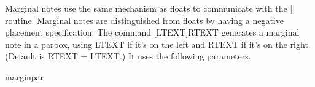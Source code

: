    Marginal notes use the same mechanism as floats to communicate
   with the |\output|  routine.  Marginal notes are distinguished from
   floats by having a negative placement specification.  The command
  \CMDI{\marginpar}[LTEXT]{RTEXT} generates a marginal note in a parbox,
    using LTEXT if it's on the left and RTEXT if it's on the right.
   (Default is RTEXT = LTEXT.)  It uses the following parameters.
%
%
%
%
%
%
%
%
%
 \begin{docCommand}{marginpar} {}
    \begin{teX}
\def\marginpar{%
  \ifhmode
    \@bsphack
    \@floatpenalty -\@Mii
  \else
    \@floatpenalty-\@Miii
  \fi
  \ifinner
    \@parmoderr
    \@floatpenalty\z@
  \else
    \@next\@currbox\@freelist{}{}%
    \@next\@marbox\@freelist{\global\count\@marbox\m@ne}%
       {\@floatpenalty\z@
        \@fltovf\def\@currbox{\@tempboxa}\def\@marbox{\@tempboxa}}%
  \fi
  \@ifnextchar [\@xmpar\@ympar}
    \end{teX}
 \end{docCommand}
